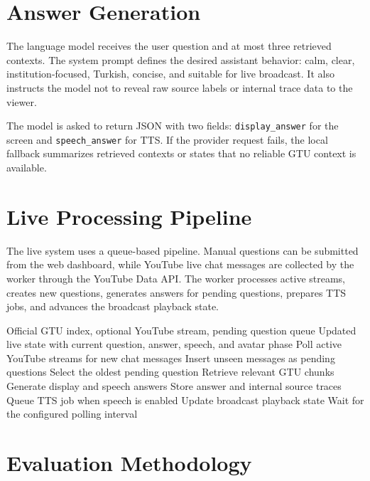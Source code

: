 \section{Answer Generation}

The language model receives the user question and at most three retrieved contexts. The system prompt defines the desired assistant behavior: calm, clear, institution-focused, Turkish, concise, and suitable for live broadcast. It also instructs the model not to reveal raw source labels or internal trace data to the viewer.

The model is asked to return JSON with two fields: \texttt{display\_answer} for the screen and \texttt{speech\_answer} for TTS. If the provider request fails, the local fallback summarizes retrieved contexts or states that no reliable GTU context is available.

\section{Live Processing Pipeline}

The live system uses a queue-based pipeline. Manual questions can be submitted from the web dashboard, while YouTube live chat messages are collected by the worker through the YouTube Data API. The worker processes active streams, creates new questions, generates answers for pending questions, prepares TTS jobs, and advances the broadcast playback state.

\begin{algorithm}
\caption{\label{alg:live-pipeline}Live question processing pipeline.}
\begin{algorithmic}
\Require Official GTU index, optional YouTube stream, pending question queue
\Ensure Updated live state with current question, answer, speech, and avatar phase
    \State Poll active YouTube streams for new chat messages
    \State Insert unseen messages as pending questions
    \State Select the oldest pending question
    \State Retrieve relevant GTU chunks
    \State Generate display and speech answers
    \State Store answer and internal source traces
    \State Queue TTS job when speech is enabled
    \State Update broadcast playback state
    \State Wait for the configured polling interval
\EndWhile
\end{algorithmic}
\end{algorithm}

\section{Evaluation Methodology}

